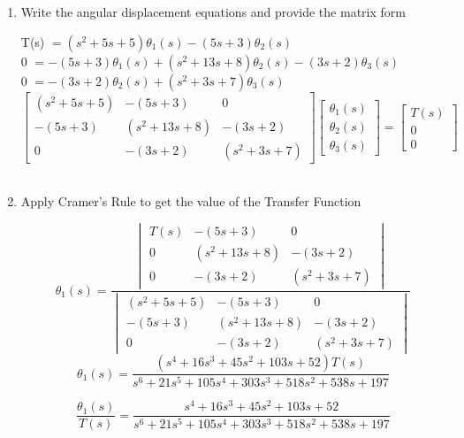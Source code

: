 \begin{fold}
\begin{enumerate}[label=(\alph*),itemindent=*, itemindent=*, leftmargin=*, nolistsep]
\begin{center}
            \end{center}

		\item Write the angular displacement equations and provide the matrix form
\begin{center}
	T(s) $= (s^2+5s+5)\theta_1(s) - (5s+3)\theta_2(s)$\\
	0 $= -(5s+3)\theta_1(s) + (s^2+13s+8)\theta_2(s) - (3s+2)\theta_3(s)$\\
    0 $= -(3s+2)\theta_2(s) + (s^2 + 3s + 7)\theta_3(s) $
	\[
		\begin{bmatrix}
		(s^2+5s+5) & -(5s+3) & 0\\
		-(5s+3) & (s^2 + 13s + 8) & -(3s+2)\\
        0 & -(3s+2) & (s^2 + 3s + 7)
		\end{bmatrix}
		\begin{bmatrix}
		\theta_1(s) \\
		\theta_2(s) \\ 
        \theta_3(s)
		\end{bmatrix}
		=
		\begin{bmatrix}
		T(s)\\
		0 \\
        0
		\end{bmatrix}
	\]\\
\end{center}
		\item Apply Cramer's Rule to get the value of the Transfer Function
\begin{center}
	\[
		\theta_1(s) = 
			\frac{\begin{vmatrix}
				T(s) & -(5s+3) & 0\\
		          0 & (s^2 + 13s + 8) & -(3s+2)\\
                0 & -(3s+2) & (s^2 + 3s + 7)
			\end{vmatrix}
		}{\begin{vmatrix}
				(s^2+5s+5) & -(5s+3) & 0\\
		          -(5s+3) & (s^2 + 13s + 8) & -(3s+2)\\
                0 & -(3s+2) & (s^2 + 3s + 7)
			\end{vmatrix}
		}
	\]
	\[
	\theta_1(s) = \frac{(s^4 + 16s^3 + 45s^2 + 103s + 52)T(s)}{s^6 + 21s^5 + 105s^4 + 303s^3 + 518s^2 + 538s + 197}
	\] 

	\[
	\boxed{\frac{\theta_1(s)}{T(s)} = \frac{s^4 + 16s^3 + 45s^2 + 103s + 52}{s^6 + 21s^5 + 105s^4 + 303s^3 + 518s^2 + 538s + 197}}
	\]
\end{center}
	\end{enumerate}


\end{fold}

